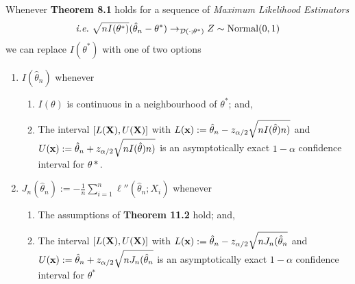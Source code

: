 \documentclass[11pt,a4paper]{article}
\begin{document}
Whenever \textbf{Theorem 8.1} holds for a sequence of \textit{Maximum Likelihood Estimators}
$$\ie\ \sqrt{nI(\theta^*)}(\hat{\theta}_n-\theta^*)\to_{\mathcal{D}(\cdot;\theta^*)}Z\sim\text{Normal}(0,1)$$
we can replace $I(\theta^*)$ with one of two options
\begin{enumerate}[label=\roman*)]
	\item $I(\hat{\theta}_n)$ whenever
	\begin{enumerate}
		\item $I(\theta)$ is continuous in a neighbourhood of $\theta^*$; and,
		\item The interval $[L(\textbf{X}),U(\textbf{X})]$ with $L(\textbf{x}):=\hat{\theta}_n-z_{\alpha/2}\sqrt{nI(\hat{\theta})n)}$ and $U(\textbf{x}):=\hat{\theta}_n+z_{\alpha/2}\sqrt{nI(\hat{\theta})n)}$ is an asymptotically exact $1-\alpha$ confidence interval for $\theta*$.
	\end{enumerate}
	\item $J_n(\hat{\theta}_n):=-\frac{1}{n}\sum\limits_{i=1}^n\ell''(\hat{\theta}_n;X_i)$ whenever
	\begin{enumerate}
		\item The assumptions of \textbf{Theorem 11.2} hold; and,
		\item The interval $[L(\textbf{X}),U(\textbf{X})]$ with $L(\textbf{x}):=\hat{\theta}_n-z_{\alpha/2}\sqrt{nJ_n(\hat{\theta}_n}$ and $U(\textbf{x}):=\hat{\theta}_n+z_{\alpha/2}\sqrt{nJ_n(\hat{\theta}_n}$ is an asymptotically exact $1-\alpha$ confidence interval for $\theta^*$
	\end{enumerate}
\end{enumerate}
\end{document}
